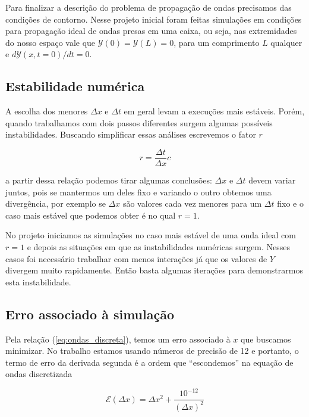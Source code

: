 \documentclass[a4paper, 11pt]{article}
\begin{document}
Para finalizar a descrição do problema de propagação de ondas precisamos das condições de
contorno. Nesse projeto inicial foram feitas simulações em condições para propagação ideal de ondas
presas em uma caixa, ou seja, nas extremidades do nosso espaço vale que $\mathcal{Y}(0) = \mathcal{Y}(L) = 0$, para um
comprimento $L$ qualquer e $d \mathcal{Y}(x, t = 0)/ dt = 0$. 


\subsection{Estabilidade numérica}
\label{sec:estabilidade}
A escolha dos menores \( \Delta x \) e \( \Delta t \) em geral levam a execuções mais estáveis. Porém, quando
trabalhamos com dois passos diferentes surgem algumas possíveis instabilidades. Buscando simplificar
essas análises escrevemos o fator $r$

\begin{equation}
  r = \frac{\Delta t}{\Delta x} c
  \label{eq:fator_r}
\end{equation}

a partir dessa relação podemos tirar algumas conclusões: \( \Delta x \) e \( \Delta t \) devem variar juntos,
pois se mantermos um deles fixo e variando o outro obtemos uma divergência, por exemplo se \( \Delta x \)
são valores cada vez menores para um \( \Delta t \) fixo e o caso mais estável que podemos obter é no
qual \( r = 1  \).

No projeto iniciamos as simulações no caso mais estável de uma onda ideal com \( r = 1 \) e depois
as situações em que as instabilidades numéricas surgem. Nesses casos foi necessário trabalhar com
menos interações já que os valores de $Y$ divergem muito rapidamente. Então basta algumas iterações
para demonstrarmos esta instabilidade.


\subsection{Erro associado à simulação}
\label{sec:erro}

Pela relação (\ref{eq:ondas_discreta}), temos um erro associado à \( x \) que buscamos
minimizar. No trabalho estamos usando números de precisão de 12 e portanto, o termo de
erro da derivada segunda é a ordem que ``escondemos'' na equação de ondas discretizada

\begin{equation}
  \mathcal{E}(\Delta x) =  \Delta x^2 + \frac{10^{-12}}{(\Delta x)^2}
\end{equation}
\end{document}
